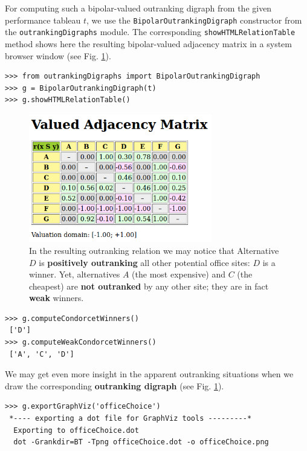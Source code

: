 For computing such a bipolar-valued outranking digraph from the given performance tableau $t$, we use the \texttt{BipolarOutrankingDigraph} constructor from the \texttt{outrankingDigraphs} module. The corresponding \texttt{showHTMLRelationTable} method shows here the resulting bipolar-valued adjacency matrix in a system browser window (see Fig. \ref{fig:6.2}).

\begin{lstlisting}
>>> from outrankingDigraphs import BipolarOutrankingDigraph
>>> g = BipolarOutrankingDigraph(t)
>>> g.showHTMLRelationTable()
\end{lstlisting}

\begin{figure}[h]
\sidecaption
\includegraphics[width=8cm]{Figures/officeChoiceOutranking.png}
\caption{In the resulting outranking relation we may notice that Alternative $D$ is \textbf{positively outranking} all other potential office sites: $D$ is a \Condorcet winner. Yet, alternatives $A$ (the most expensive) and $C$ (the cheapest) are \textbf{not outranked} by any other site; they are in fact \textbf{weak} \Condorcet winners.
}
\label{fig:6.2}       %
\end{figure}

\begin{lstlisting}
>>> g.computeCondorcetWinners()
 ['D']
>>> g.computeWeakCondorcetWinners()
 ['A', 'C', 'D']
\end{lstlisting}

We may get even more insight in the apparent outranking situations when we draw the corresponding \textbf{outranking digraph} (see Fig. \ref{fig:6.2}).

\begin{lstlisting}
>>> g.exportGraphViz('officeChoice')
 *---- exporting a dot file for GraphViz tools ---------*
  Exporting to officeChoice.dot
  dot -Grankdir=BT -Tpng officeChoice.dot -o officeChoice.png
\end{lstlisting}


